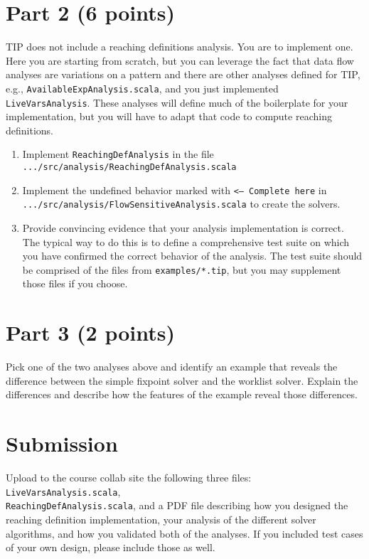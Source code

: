 \documentclass[12pt,letterpaper]{article}
\begin{document}
\section*{Part 2 (6 points)}
TIP does not include a reaching definitions analysis.  You are to implement one.
Here you are starting from scratch, but you can leverage the fact that data flow analyses are variations on a pattern and there are other analyses defined for TIP, e.g., \texttt{AvailableExpAnalysis.scala}, and you just implemented \texttt{LiveVarsAnalysis}.  These analyses will define much of the boilerplate for your implementation, but you will have to adapt that code to compute reaching definitions.
\begin{enumerate}
\item Implement \texttt{ReachingDefAnalysis} in the file \texttt{.../src/analysis/ReachingDefAnalysis.scala}
\item Implement the undefined behavior marked with \texttt{<--- Complete here} in\\ 
\texttt{.../src/analysis/FlowSensitiveAnalysis.scala} to create the solvers.
\item Provide convincing evidence that your analysis implementation is correct.  The typical way to do this is to define a comprehensive test suite on which you have confirmed the correct behavior of the analysis.  The test suite should be comprised of the files from \texttt{examples/*.tip}, but you may supplement those files if you choose.
\end{enumerate}

\section*{Part 3 (2 points)}
Pick one of the two analyses above and identify an example that reveals the difference between the simple fixpoint solver and the worklist solver.  Explain the differences and describe how the features of the example reveal those differences.

\section*{Submission} 
Upload to the course collab site the following three files: \texttt{LiveVarsAnalysis.scala},\\
\texttt{ReachingDefAnalysis.scala}, and a PDF file describing how you designed the reaching definition implementation, your analysis of the different solver algorithms, and how you validated both of the analyses.  If you included test cases of your own design, please include those as well.
\end{document}
